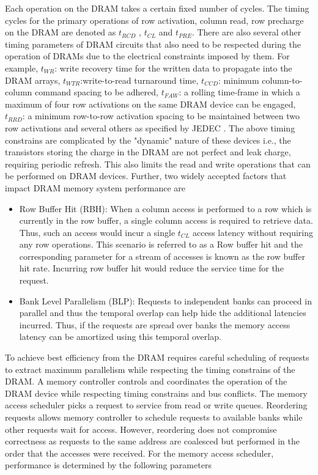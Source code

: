 \par Each operation on the DRAM takes a certain fixed number of cycles. The timing cycles for the primary operations of row activation, column read, row precharge on the DRAM are denoted as $t_{RCD}$ , $t_{CL}$ and $t_{PRE}$. There are also several other timing parameters of DRAM circuits that also need to be respected during the operation of DRAMs due to the electrical constraints imposed by them. For example, $t_{WR}$: write recovery time for the written data to propagate into the DRAM arrays, $t_{WTR}$:write-to-read turnaround time, $t_{CCD}$: minimum column-to-column command spacing to be adhered, $t_{FAW}$: a rolling time-frame in which a maximum of four row activations on the same DRAM device can be engaged, $t_{RRD}$: a minimum row-to-row activation spacing to be maintained between two row activations and several others as specified by JEDEC \cite{jedec-ddr3}. The above timing constrains are complicated by the "dynamic" nature of these devices i.e., the transistors storing the charge in the DRAM are not perfect and leak charge, requiring periodic refresh. This also limits the read and write operations that can be performed on DRAM devices.
Further, two widely accepted factors that impact DRAM memory system performance are
\begin{itemize}
	\item Row Buffer Hit (RBH): When a column access is performed to a row which is currently in the row buffer, a single column access is required to retrieve data. Thus, such an access would incur a single $t_{CL}$ access latency without requiring any row operations. This scenario is referred to as a Row buffer hit and the corresponding parameter for a stream of accesses is known as the row buffer hit rate. Incurring row buffer hit would reduce the service time for the request. 
	\item Bank Level Parallelism (BLP): Requests to independent banks can proceed in parallel and thus the temporal overlap can help hide the additional latencies incurred. Thus, if the requests are spread over banks the memory access latency can be amortized using this temporal overlap.
\end{itemize}
\par To achieve best efficiency from the DRAM requires careful scheduling of requests to extract maximum parallelism while respecting the timing constrains of the DRAM. A memory controller controls and coordinates the operation of the DRAM device while respecting timing constrains and bus conflicts. The memory access scheduler picks a request to service from read or write queues. Reordering requests allows memory controller to schedule requests to available banks while other requests wait for access. However, reordering does not compromise correctness as requests to the same address are coalesced but performed in the order that the accesses were received. For the memory access scheduler, performance is determined by the following parameters
